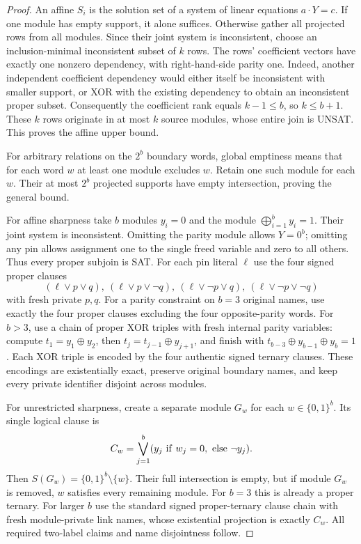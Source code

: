 \documentclass[11pt]{article}
\begin{document}
\begin{proof}
An affine $S_i$ is the solution set of a system of linear equations $a\cdot Y=c$. If one module has empty support, it alone suffices. Otherwise gather all projected rows from all modules. Since their joint system is inconsistent, choose an inclusion-minimal inconsistent subset of $k$ rows. The rows' coefficient vectors have exactly one nonzero dependency, with right-hand-side parity one. Indeed, another independent coefficient dependency would either itself be inconsistent with smaller support, or XOR with the existing dependency to obtain an inconsistent proper subset. Consequently the coefficient rank equals $k-1\le b$, so $k\le b+1$. These $k$ rows originate in at most $k$ source modules, whose entire join is UNSAT. This proves the affine upper bound.

For arbitrary relations on the $2^b$ boundary words, global emptiness means that for each word $w$ at least one module excludes $w$. Retain one such module for each $w$. Their at most $2^b$ projected supports have empty intersection, proving the general bound.

For affine sharpness take $b$ modules $y_i=0$ and the module $\bigoplus_{i=1}^b y_i=1$. Their joint system is inconsistent. Omitting the parity module allows $Y=0^b$; omitting any pin allows assignment one to the single freed variable and zero to all others. Thus every proper subjoin is SAT. For each pin literal $\ell$ use the four signed proper clauses
\[
(\ell\vee p\vee q),\
(\ell\vee p\vee\neg q),\
(\ell\vee\neg p\vee q),\
(\ell\vee\neg p\vee\neg q)
\]
with fresh private $p,q$. For a parity constraint on $b=3$ original names, use exactly the four proper clauses excluding the four opposite-parity words. For $b>3$, use a chain of proper XOR triples with fresh internal parity variables: compute $t_1=y_1\oplus y_2$, then $t_j=t_{j-1}\oplus y_{j+1}$, and finish with $t_{b-3}\oplus y_{b-1}\oplus y_b=1$. Each XOR triple is encoded by the four authentic signed ternary clauses. These encodings are existentially exact, preserve original boundary names, and keep every private identifier disjoint across modules.

For unrestricted sharpness, create a separate module $G_w$ for each $w\in\{0,1\}^b$. Its single logical clause is
\[
C_w=\bigvee_{j=1}^b (y_j\ {\rm if}\ w_j=0,\ {\rm else}\ \neg y_j).
\]
Then $S(G_w)=\{0,1\}^b\setminus\{w\}$. Their full intersection is empty, but if module $G_w$ is removed, $w$ satisfies every remaining module. For $b=3$ this is already a proper ternary. For larger $b$ use the standard signed proper-ternary clause chain with fresh module-private link names, whose existential projection is exactly $C_w$. All required two-label claims and name disjointness follow. 
\end{proof}
\end{document}
